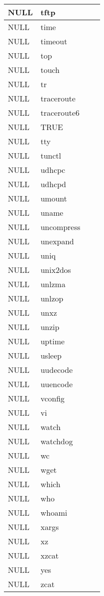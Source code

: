\begin{longtable}{llp{60mm}p{60mm}}
      NULL& tftp \\
     \hline
      NULL& time \\
     \hline
      NULL& timeout \\
     \hline
      NULL& top \\
     \hline
      NULL& touch \\
     \hline
      NULL& tr \\
     \hline
      NULL& traceroute \\
     \hline
      NULL& traceroute6 \\
     \hline
      NULL& TRUE \\
     \hline
      NULL& tty \\
     \hline
      NULL& tunctl \\
     \hline
      NULL& udhcpc \\
     \hline
      NULL& udhcpd \\
     \hline
      NULL& umount \\
     \hline
      NULL& uname \\
     \hline
      NULL& uncompress \\
     \hline
      NULL& unexpand \\
     \hline
      NULL& uniq \\
     \hline
      NULL& unix2dos \\
     \hline
      NULL& unlzma \\
     \hline
      NULL& unlzop \\
     \hline
      NULL& unxz \\
     \hline
      NULL& unzip \\
     \hline
      NULL& uptime \\
     \hline
      NULL& usleep \\
     \hline
      NULL& uudecode \\
     \hline
      NULL& uuencode \\
     \hline
      NULL& vconfig \\
     \hline
      NULL& vi \\
     \hline
      NULL& watch \\
     \hline
      NULL& watchdog \\
     \hline
      NULL& wc \\
     \hline
      NULL& wget \\
     \hline
      NULL& which \\
     \hline
      NULL& who \\
     \hline
      NULL& whoami \\
     \hline
      NULL& xargs \\
     \hline
      NULL& xz \\
     \hline
      NULL& xzcat \\
     \hline
      NULL& yes \\
     \hline
      NULL& zcat \\
     \hline
\end{longtable}
